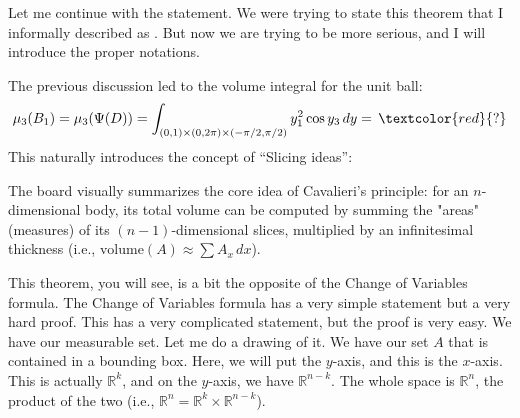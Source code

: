 \begin{spoken-clean}[00:00:00 - 00:00:12]
Let me continue with the statement. We were trying to state this theorem that I informally described as . But now we are trying to be more serious, and I will introduce the proper notations.
\end{spoken-clean}

\begin{math-stroke}
The previous discussion led to the volume integral for the unit ball:
\[
\mu_3(B_1) = \mu_3(\Psi(D)) = \int_{(0,1)\times(0,2\pi)\times(-\pi/2,\pi/2)} y_1^2 \cos y_3 \, dy = \, \textcolor{red}{?}
\]
This naturally introduces the concept of ``Slicing ideas'':
\begin{center}
\end{center}
\begin{explanation-of-steps}
The board visually summarizes the core idea of Cavalieri's principle: for an $n$-dimensional body, its total volume can be computed by summing the "areas" (measures) of its $(n-1)$-dimensional slices, multiplied by an infinitesimal thickness (i.e., $\text{volume}(A) \approx \sum A_x \, dx$).
\end{explanation-of-steps}
\end{math-stroke}

\begin{spoken-clean}[00:00:12 - 00:02:20]
This theorem, you will see, is a bit the opposite of the Change of Variables formula. The Change of Variables formula has a very simple statement but a very hard proof. This has a very complicated statement, but the proof is very easy. We have our measurable set. Let me do a drawing of it. We have our set $A$ that is contained in a bounding box. Here, we will put the $y$-axis, and this is the $x$-axis. This is actually $\mathbb{R}^k$, and on the $y$-axis, we have $\mathbb{R}^{n-k}$. The whole space is $\mathbb{R}^n$, the product of the two (i.e., $\mathbb{R}^n = \mathbb{R}^k \times \mathbb{R}^{n-k}$).
\end{spoken-clean}

